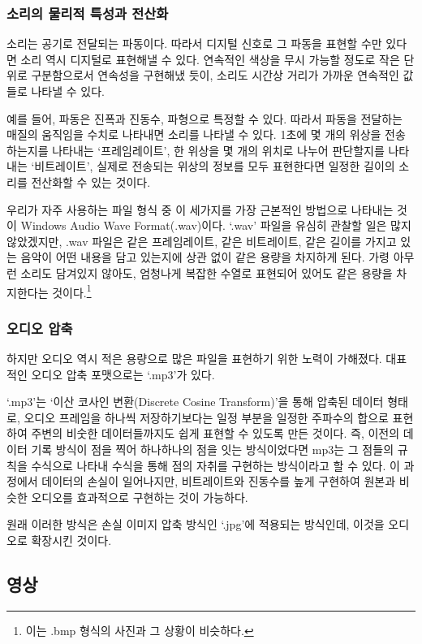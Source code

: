 \documentclass{article}
\begin{document}
\subsubsection{소리의 물리적 특성과 전산화}

소리는 공기로 전달되는 파동이다. 따라서 디지털 신호로 그 파동을 표현할 수만 있다면 소리 역시
디지털로 표현해낼 수 있다.
연속적인 색상을 무시 가능할 정도로 작은 단위로 구분함으로서 연속성을 구현해냈 듯이, 소리도 시간상
거리가 가까운 연속적인 값들로 나타낼 수 있다.

예를 들어, 파동은 진폭과 진동수, 파형으로 특정할 수 있다. 따라서 파동을 전달하는 매질의 움직임을
수치로 나타내면 소리를 나타낼 수 있다.
1초에 몇 개의 위상을 전송하는지를 나타내는 `프레임레이트', 한 위상을 몇 개의 위치로 나누어 판단할지를
나타내는 `비트레이트', 실제로 전송되는 위상의 정보를 모두 표현한다면 일정한 길이의 소리를 전산화할
수 있는 것이다.

우리가 자주 사용하는 파일 형식 중 이 세가지를 가장 근본적인 방법으로 나타내는 것이
Windows Audio Wave Format(.wav)이다. `.wav' 파일을 유심히 관찰할 일은 많지 않았겠지만,
.wav 파일은 같은 프레임레이트, 같은 비트레이트, 같은 길이를 가지고 있는 음악이 어떤 내용을
담고 있는지에 상관 없이 같은 용량을 차지하게 된다.
가령 아무런 소리도 담겨있지 않아도, 엄청나게 복잡한 수열로 표현되어 있어도 같은 용량을 차지한다는
것이다.\footnote{이는 .bmp 형식의 사진과 그 상황이 비슷하다.}

\subsubsection{오디오 압축}

하지만 오디오 역시 적은 용량으로 많은 파일을 표현하기 위한 노력이 가해졌다.
대표적인 오디오 압축 포맷으로는 `.mp3'가 있다.

`.mp3'는 `이산 코사인 변환(Discrete Cosine Transform)'을 통해 압축된 데이터 형태로,
오디오 프레임을 하나씩 저장하기보다는 일정 부분을 일정한 주파수의 합으로 표현하여
주변의 비숫한 데이터들까지도 쉽게 표현할 수 있도록 만든 것이다.
즉, 이전의 데이터 기록 방식이 점을 찍어 하나하나의 점을 잇는 방식이었다면
mp3는 그 점들의 규칙을 수식으로 나타내 수식을 통해 점의 자취를 구현하는 방식이라고 할 수 있다.
이 과정에서 데이터의 손실이 일어나지만, 비트레이트와 진동수를 높게 구현하여
원본과 비슷한 오디오를 효과적으로 구현하는 것이 가능하다.

원래 이러한 방식은 손실 이미지 압축 방식인 `.jpg'에 적용되는 방식인데,
이것을 오디오로 확장시킨 것이다.

\subsection{영상}
\end{document}
